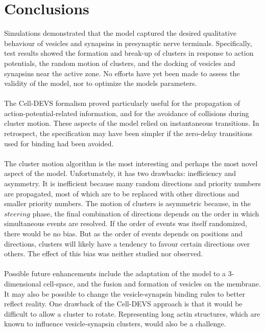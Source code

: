 \documentclass{acm_proc_article-sp}
\begin{document}
\section{Conclusions}
Simulations demonstrated that the model captured
the desired qualitative behaviour of vesicles 
and synapsins in presynaptic nerve terminals.
Specifically, test results showed the formation 
and break-up of clusters in response to action
potentials, the random motion of clusters, and
the docking of vesicles and synapsins near the
active zone.  No efforts have yet been made to 
assess the validity of the model, nor to optimize
the models parameters.\\
\\
The Cell-DEVS formalism proved particularly 
useful for the propagation of action-potential-related
information, and for the avoidance of 
collisions during cluster motion.  These aspects
of the model relied on instantaneous transitions.
In retrospect, the specification may
have been simpler if the zero-delay transitions
used for binding had been avoided. \\
\\
The cluster motion algorithm is the most 
interesting and perhaps the most novel aspect of
the model.  Unfortunately, it has two drawbacks:
inefficiency and asymmetry.  It is inefficient
because many random directions and priority numbers
are propagated, most of which are to be replaced 
with other directions and smaller priority numbers.
The motion of clusters is asymmetric because, in the
$steering$ phase, the final combination of 
directions depends on the order in which simultaneous
events are resolved.  If the order of events was 
itself randomized, there would be no bias.  But as
the order of events depends on positions and directions,
clusters will likely have a tendency to favour certain
directions over others.  The effect of this bias was
neither studied nor observed. \\
\\
Possible future enhancements include the adaptation of the
model to a 3-dimensional cell-space, and the fusion and 
formation of vesicles on the membrane.  It may also be
possible to change the vesicle-synapsin binding rules 
to better reflect reality.  One drawback of the Cell-DEVS 
approach is that it would be difficult to allow a cluster to rotate.
Representing long actin structures, which are known to influence 
vesicle-synapsin clusters, would also be a challenge. 




\balancecolumns
\end{document}
